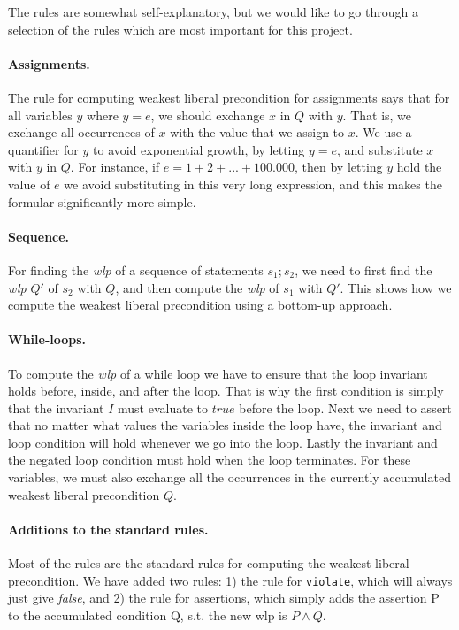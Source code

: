 The rules are somewhat self-explanatory, but we would like to go through a selection of the rules which are most important for this project.

\paragraph{Assignments.}
The rule for computing weakest liberal precondition for assignments says that for all variables $y$ where $y = e$, we should exchange $x$ in $Q$ with $y$. That is, we exchange all occurrences of $x$ with the value that we assign to $x$.
We use a quantifier for $y$ to avoid exponential growth, by letting $y=e$, and substitute $x$ with $y$ in $Q$.
For instance, if $e=1+2+...+100.000$, then by letting $y$ hold the value of $e$ we avoid substituting in this very long expression, and this makes the formular significantly more simple.

\paragraph{Sequence.}
For finding the \textit{wlp} of a sequence of statements $s_1;s_2$, we need to first find the \textit{wlp} $Q'$ of $s_2$ with $Q$, and then compute the \textit{wlp} of $s_1$ with $Q'$. 
This shows how we compute the weakest liberal precondition using a bottom-up approach.

\paragraph{While-loops.}
To compute the \textit{wlp} of a while loop we have to ensure that the loop invariant holds before, inside, and after the loop. 
That is why the first condition is simply that the invariant $I$ must evaluate to $true$ before the loop.
Next we need to assert that no matter what values the variables inside the loop have, the invariant and loop condition will hold whenever we go into the loop.
Lastly the invariant and the negated loop condition must hold when the loop terminates.
For these variables, we must also exchange all the occurrences in the currently accumulated weakest liberal precondition $Q$.

\paragraph{Additions to the standard rules.}
Most of the rules are the standard rules for computing the weakest liberal precondition. We have added two rules: 1) the rule for \texttt{violate}, which will always just give \textit{false}, and 2) the rule for assertions, which simply adds the assertion P to the accumulated condition Q, s.t. the new wlp is $P \land Q$.

